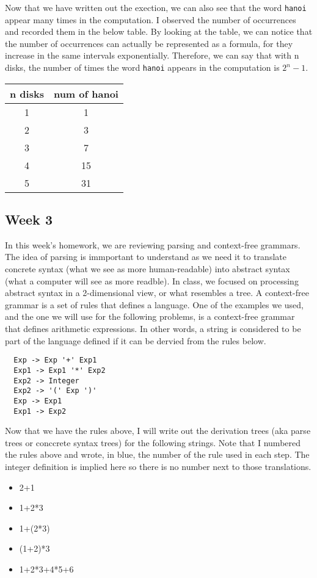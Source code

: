 \documentclass{article}
\theoremstyle{theorem}
\theoremstyle{definition}
\theoremstyle{remark}
\begin{document}
Now that we have written out the exection, we can also see that the word \texttt{hanoi} appear many times in the computation. I observed the number of occurrences and recorded them in the below table. By looking at the table, we can notice that the
number of occurrences can actually be represented as a formula, for they increase in the same intervals exponentially. Therefore, we can say that with n disks, the number of times the word \texttt{hanoi} appears in the computation is \(2^n - 1\). 
\begin{center}
  \begin{tabular}{|c c|}
    \hline
    n disks & num of hanoi \\
    \hline 
    1 & 1 \\
    \hline 
    2 & 3 \\
    \hline 
    3 & 7 \\
    \hline 
    4 & 15 \\
    \hline 
    5 & 31 \\
    \hline
  \end{tabular}
\end{center}

\subsection{Week 3}
In this week's homework, we are reviewing parsing and context-free grammars. The idea of parsing is immportant to understand as we need it to translate concrete syntax (what we see as more human-readable) into abstract syntax (what a computer will see as more readble). 
In class, we focused on processing abstract syntax in a 2-dimensional view, or what resembles a tree. A context-free grammar is a set of rules that defines a language. One of the examples we used, and the one we will use for the following problems, is a context-free grammar that 
defines arithmetic expressions. In other words, a string is considered to be part of the language defined if it can be dervied from the rules below.
\begin{verbatim}
  Exp -> Exp '+' Exp1
  Exp1 -> Exp1 '*' Exp2
  Exp2 -> Integer 
  Exp2 -> '(' Exp ')'
  Exp -> Exp1
  Exp1 -> Exp2
\end{verbatim}
Now that we have the rules above, I will write out the derivation trees (aka parse trees or conccrete syntax trees) for the following strings. Note that I numbered the rules above and wrote, in blue, the number of the rule used in each step. The integer definition is implied here so there is no 
number next to those translations. 
\begin{itemize}
  \item 2+1
  \item 1+2*3
  \item 1+(2*3)
  \item (1+2)*3
  \item 1+2*3+4*5+6
\end{itemize}
\end{document}
